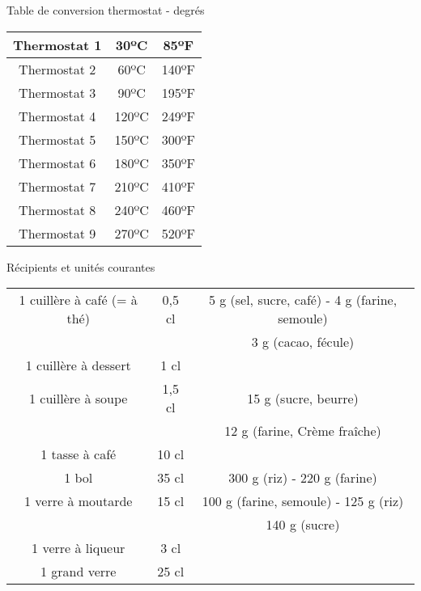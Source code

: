 \begin{bclogo}[logo=\bcinfo, epBord=1.2, couleur=ciel, arrondi=0.1, ombre=false, barre =motif ,motifBarre = ]{Table de conversion thermostat - degrés}\end{bclogo}
\centering\begin{tabular}{|c c c|}
\hline
Thermostat 1 & 30ºC &  85ºF  \\
\hline
Thermostat 2 & 60ºC &  140ºF \\
\hline
Thermostat 3 & 90ºC &  195ºF \\
\hline
Thermostat 4 & 120ºC & 249ºF\\
\hline
Thermostat 5 & 150ºC & 300ºF\\
\hline
Thermostat 6 & 180ºC & 350ºF\\
\hline
Thermostat 7 & 210ºC & 410ºF\\
\hline
Thermostat 8 & 240ºC & 460ºF\\
\hline
Thermostat 9 & 270ºC & 520ºF\\
\hline
\end{tabular}

\bigskip
\begin{bclogo}[logo=\bcinfo, epBord=1.2, couleur=ciel, arrondi=0.1, ombre=false, barre =motif ,motifBarre = ]{Récipients et unités courantes}\end{bclogo}
\centering\begin{tabular}{|c c c|}
\hline
1 cuillère à café (= à thé) 	& 0,5 cl &	5 g (sel, sucre, café) - 4 g (farine, semoule)\\
				&        &      3 g (cacao, fécule)\\
\hline
1 cuillère à dessert &	1 cl &	\\
\hline
1 cuillère à soupe &	1,5 cl &	15 g (sucre, beurre)\\
		&		&	12 g (farine, Crème fraîche)\\
\hline
1 tasse à café 	& 10 cl& 	\\
\hline
1 bol 	&35 cl 	& 300 g (riz) - 220 g (farine)\\
\hline
1 verre à moutarde &	15 cl & 	100 g (farine, semoule) - 125 g (riz)\\
		&		&	140 g (sucre)\\
\hline
1 verre à liqueur &	3 cl& 	\\
\hline
1 grand verre 	& 25 cl&  \\
\hline
\end{tabular}
